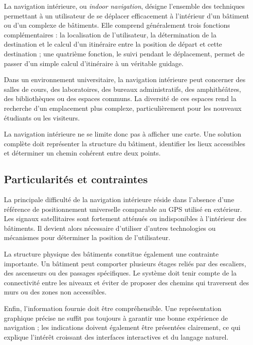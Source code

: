 \documentclass[12pt,a4paper]{report}
\begin{document}
La navigation intérieure, ou \emph{indoor navigation}, désigne l'ensemble des techniques
permettant à un utilisateur de se déplacer efficacement à l'intérieur d'un bâtiment ou d'un
complexe de bâtiments. Elle comprend généralement trois fonctions complémentaires : la
localisation de l'utilisateur, la détermination de la destination et le calcul d'un itinéraire
entre la position de départ et cette destination ; une quatrième fonction, le suivi pendant le
déplacement, permet de passer d'un simple calcul d'itinéraire à un véritable guidage.

Dans un environnement universitaire, la navigation intérieure peut concerner des salles de cours,
des laboratoires, des bureaux administratifs, des amphithéâtres, des bibliothèques ou des espaces
communs. La diversité de ces espaces rend la recherche d'un emplacement plus complexe,
particulièrement pour les nouveaux étudiants ou les visiteurs.

La navigation intérieure ne se limite donc pas à afficher une carte. Une solution complète doit
représenter la structure du bâtiment, identifier les lieux accessibles et déterminer un chemin
cohérent entre deux points.

\subsection{Particularités et contraintes}

La principale difficulté de la navigation intérieure réside dans l'absence d'une référence de
positionnement universelle comparable au GPS utilisé en extérieur. Les signaux satellitaires sont
fortement atténués ou indisponibles à l'intérieur des bâtiments. Il devient alors nécessaire
d'utiliser d'autres technologies ou mécanismes pour déterminer la position de l'utilisateur.

La structure physique des bâtiments constitue également une contrainte importante. Un bâtiment
peut comporter plusieurs étages reliés par des escaliers, des ascenseurs ou des passages
spécifiques. Le système doit tenir compte de la connectivité entre les niveaux et éviter de
proposer des chemins qui traversent des murs ou des zones non accessibles.

Enfin, l'information fournie doit être compréhensible. Une représentation graphique précise ne
suffit pas toujours à garantir une bonne expérience de navigation ; les indications doivent
également être présentées clairement, ce qui explique l'intérêt croissant des interfaces
interactives et du langage naturel.
\end{document}
